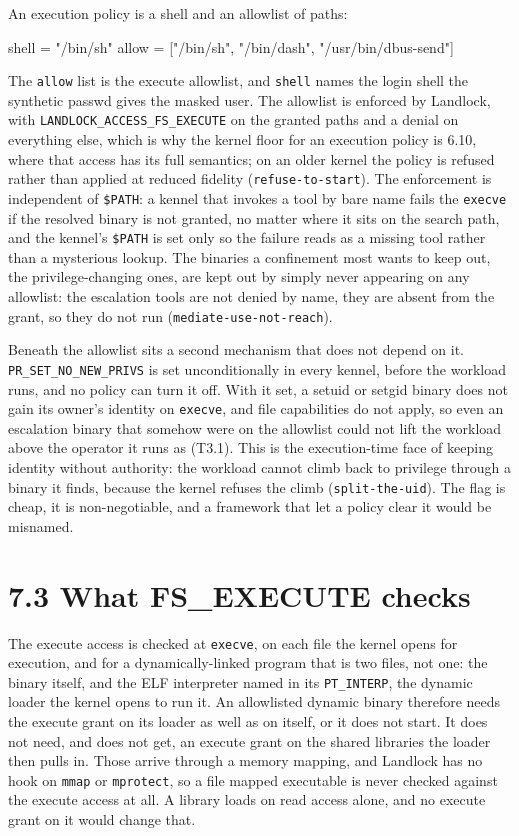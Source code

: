 An execution policy is a shell and an allowlist of paths:

\begin{kennelcode}
[exec]
shell = "/bin/sh"
allow = ["/bin/sh", "/bin/dash", "/usr/bin/dbus-send"]
\end{kennelcode}

The \texttt{allow} list is the execute allowlist, and \texttt{shell}
names the login shell the synthetic passwd gives the masked user. The
allowlist is enforced by Landlock, with
\texttt{LANDLOCK\_ACCESS\_FS\_EXECUTE} on the granted paths and a denial
on everything else, which is why the kernel floor for an execution
policy is 6.10, where that access has its full semantics; on an older
kernel the policy is refused rather than applied at reduced fidelity
(\texttt{refuse-to-start}). The enforcement is independent of
\texttt{\$PATH}: a kennel that invokes a tool by bare name fails the
\texttt{execve} if the resolved binary is not granted, no matter where
it sits on the search path, and the kennel's \texttt{\$PATH} is set only
so the failure reads as a missing tool rather than a mysterious lookup.
The binaries a confinement most wants to keep out, the
privilege-changing ones, are kept out by simply never appearing on any
allowlist: the escalation tools are not denied by name, they are absent
from the grant, so they do not run (\texttt{mediate-use-not-reach}).

Beneath the allowlist sits a second mechanism that does not depend on
it. \texttt{PR\_SET\_NO\_NEW\_PRIVS} is set unconditionally in every
kennel, before the workload runs, and no policy can turn it off. With it
set, a setuid or setgid binary does not gain its owner's identity on
\texttt{execve}, and file capabilities do not apply, so even an
escalation binary that somehow were on the allowlist could not lift the
workload above the operator it runs as (T3.1). This is the
execution-time face of keeping identity without authority: the workload
cannot climb back to privilege through a binary it finds, because the
kernel refuses the climb (\texttt{split-the-uid}). The flag is cheap, it
is non-negotiable, and a framework that let a policy clear it would be
misnamed.

\hypertarget{what-fs_execute-checks}{%
\section{7.3 What FS\_EXECUTE checks}\label{what-fs_execute-checks}}

The execute access is checked at \texttt{execve}, on each file the
kernel opens for execution, and for a dynamically-linked program that is
two files, not one: the binary itself, and the ELF interpreter named in
its \texttt{PT\_INTERP}, the dynamic loader the kernel opens to run it.
An allowlisted dynamic binary therefore needs the execute grant on its
loader as well as on itself, or it does not start. It does not need, and
does not get, an execute grant on the shared libraries the loader then
pulls in. Those arrive through a memory mapping, and Landlock has no
hook on \texttt{mmap} or \texttt{mprotect}, so a file mapped executable
is never checked against the execute access at all. A library loads on
read access alone, and no execute grant on it would change that.

